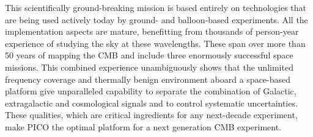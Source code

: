 \documentclass[PICOReport.tex]{subfiles}
\begin{document}
This scientifically ground-breaking mission is based entirely on technologies that are being used actively today by ground- and balloon-based experiments. All the implementation aspects are mature, benefitting from thousands of person-year experience of studying the sky at these wavelengths. These span over more than 50 years of mapping the CMB and include three enormously successful space missions. This combined experience unambiguously shows that the unlimited frequency coverage and thermally benign environment aboard a space-based platform give unparalleled capability to separate the combination of Galactic, extragalactic and cosmological signals and to control systematic uncertainties. These qualities, which are critical ingredients for any next-decade experiment, make PICO the optimal platform for a next generation CMB experiment. 






\end{document}
